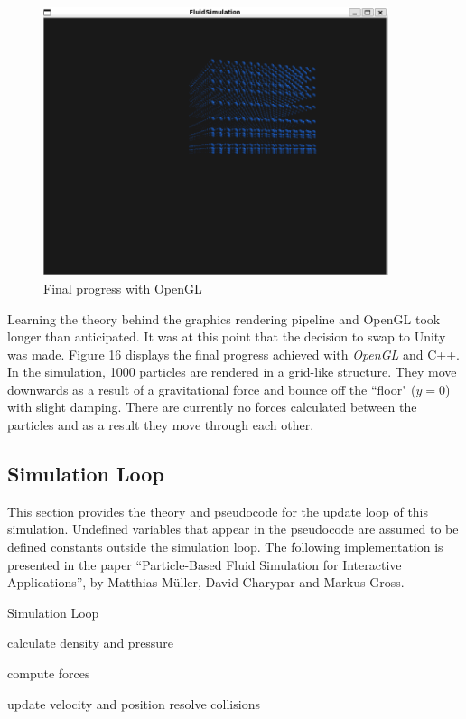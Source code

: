 \documentclass[12pt]{article}
\begin{document}
    \begin{figure}[H]
        \begin{center}
            \includegraphics[width=0.9\textwidth]{openGLProg.png}
            \caption{Final progress with OpenGL}
        \end{center}
    \end{figure}
    
    Learning the theory behind the graphics rendering pipeline and OpenGL took longer than anticipated. It was at this point that the decision to swap to Unity was made. Figure 16 displays the final progress achieved with \textit{OpenGL} and C++. In the simulation, 1000 particles are rendered in a grid-like structure. They move downwards as a result of a gravitational force and bounce off the ``floor" ($y = 0$) with slight damping. There are currently no forces calculated between the particles and as a result they move through each other.

    \subsection{Simulation Loop}

    This section provides the theory and pseudocode for the update loop of this simulation. Undefined variables that appear in the pseudocode are assumed to be defined constants outside the simulation loop. The following implementation is presented in the paper ``Particle-Based Fluid Simulation for Interactive Applications'', by Matthias Müller, David Charypar and Markus Gross\cite{sca}.

    \begin{algorithm}
        \caption{Simulation Loop}

        \begin{algorithmic}[1]
                \State calculate density and pressure
            \EndFor

                \State compute forces
            \EndFor

                \State update velocity and position
                \State resolve collisions
            \EndFor
        \end{algorithmic}

    \end{algorithm}
\end{document}
